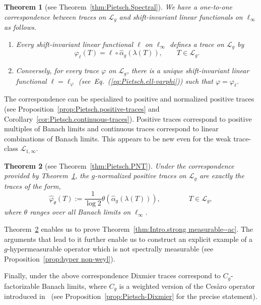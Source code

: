 \documentclass[10pt, a4paper]{amsart}
\newcommand{\sL}{\mathscr{L}}
\numberwithin{equation}{section}
\newtheorem{theoremalph}{Theorem}
\theoremstyle{definition}
\theoremstyle{remark}
\begin{document}
\begin{theoremalph}[see Theorem~\ref{thm:Pietsch.Spectral}] \label{thm:Intro.Pietsch}
 We have a one-to-one correspondence between traces on $\sL_g$ and shift-invariant linear functionals on $\ell_\infty$ as follows.
\begin{enumerate}
 \item Every shift-invariant linear functional $\ell$ on $\ell_\infty$ defines a trace on $\sL_g$ by
 \begin{equation*}
\varphi_\ell(T)= \ell\circ\hat{\alpha}_g\left(\lambda(T)\right), \qquad T\in \sL_g.
\end{equation*}

\item Conversely, for every trace $\varphi$ on $\sL_g$, there is a unique shift-invariant linear functional $\ell=\ell_\varphi$ (see~Eq.~(\ref{eq:Pietsch.ell-varphi})) such that
$\varphi=\varphi_\ell$.
\end{enumerate}
\end{theoremalph}

The correspondence can be specialized to positive and normalized positive traces (see Proposition~\ref{prop:Pietsch.positive-traces} and Corollary~\ref{cor:Pietsch.continuous-traces}). Positive traces correspond to positive multiples of Banach limits and continuous traces correspond to linear combinations of Banach limits. This appears to be new even for the weak trace-class  $\sL_{1,\infty}$.

\begin{theoremalph}[see Theorem~\ref{thm:Pietsch.PNT}]\label{thm:Intro.Pietsch-pn}
Under the correspondence provided by Theorem~\ref{thm:Intro.Pietsch}, the $g$-normalized positive traces on $\sL_g$ are exactly the traces of the form,
 \begin{equation*}
\hat{\varphi}_\theta(T):= \frac{1}{\log 2}\theta\left(\hat{\alpha}_g\left(\lambda(T)\right)\right), \qquad \qquad T\in \sL_g,
\end{equation*}
where $\theta$ ranges over all Banach limits on $\ell_\infty$.
\end{theoremalph}

Theorem~\ref{thm:Intro.Pietsch-pn} enables us to prove Theorem~\ref{thm:Intro.strong measurable--ac}. The arguments that lead to it further enable us to construct an explicit example of a $g$-hypermeasurable operator which is not spectrally measurable (see Proposition~\ref{prop:hyper non-weyl}).

Finally, under the above correspondence Dixmier traces correspond to $C_g$-factorizable Banach limits, where $C_g$ is a weighted version of the Ces\`aro operator introduced in~\cite{LU:JMAA25} (see Proposition~\ref{prop:Pietsch-Dixmier} for the precise statement).
\end{document}

